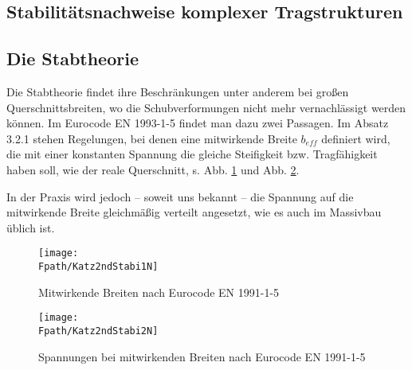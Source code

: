 {\textcolor{sectionTitleBlue}{\section{Stabilit\"{a}tsnachweise komplexer Tragstrukturen }}}
\vspace{-0.5cm}


{\textcolor{sectionTitleBlue}{\subsection{Die Stabtheorie }}}

Die Stabtheorie findet ihre Beschr\"{a}nkungen unter anderem bei gro{\ss}en Querschnittsbreiten, wo die Schubverformungen nicht mehr vernachl\"{a}ssigt werden k\"{o}nnen. Im Eurocode EN 1993-1-5 findet man dazu zwei Passagen. Im Absatz 3.2.1 stehen Regelungen, bei denen eine mitwirkende Breite $b_{eff}$ definiert wird, die mit einer konstanten Spannung die gleiche Steifigkeit bzw. Tragf\"{a}higkeit haben soll, wie der reale Querschnitt, s. Abb. \ref{Katz2ndStabi1} und Abb. \ref{Katz2ndStabi2}.

In der Praxis wird jedoch -- soweit uns bekannt -- die Spannung auf die mitwirkende Breite gleichm\"{a}{\ss}ig verteilt angesetzt, wie es auch im Massivbau \"{u}blich ist.
\begin{figure}[tbp] \centering
\centering
\if {} \sidecaption[t] \fi
\texttt{[image: \\Fpath/Katz2ndStabi1N]}
\caption{Mitwirkende Breiten nach Eurocode EN 1991-1-5} \label{Katz2ndStabi1}
\end{figure}%
\begin{figure}[tbp] \centering
\centering
\if {} \sidecaption[t] \fi
\texttt{[image: \\Fpath/Katz2ndStabi2N]}
\caption{Spannungen bei mitwirkenden Breiten nach Eurocode EN 1991-1-5} \label{Katz2ndStabi2}
\end{figure}%

